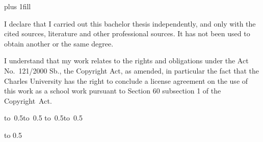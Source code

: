 \openright
\hypersetup{pageanchor=true}
\pagestyle{plain}
\vglue 0pt plus 1fill

\noindent
I declare that I carried out this bachelor thesis independently, and only with the cited
sources, literature and other professional sources. It has not been used to obtain another
or the same degree.

\medskip\noindent
I understand that my work relates to the rights and obligations under the Act No.~121/2000 Sb.,
the Copyright Act, as amended, in particular the fact that the Charles
University has the right to conclude a license agreement on the use of this
work as a school work pursuant to Section 60 subsection 1 of the Copyright~Act.

\vspace{10mm}

\hbox{\hbox to 0.5\hbox to 0.5\hsize{\dotfill\quad}}
\smallskip
\hbox{\hbox to 0.5\hsize{}\hbox to 0.5}

\vspace{20mm}
\newpage


\openright

\noindent
\Dedication

\newpage


\openright

\vbox to 0.5

\newpage

\openright
\pagestyle{plain}
\setcounter{page}{1}
